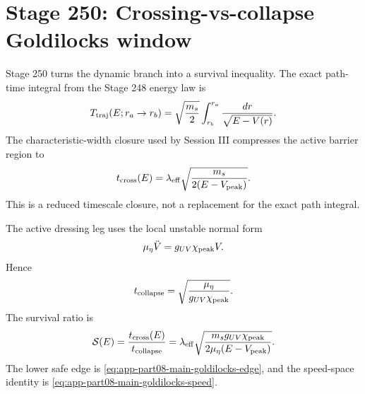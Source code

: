 \section{Stage 250: Crossing-vs-collapse Goldilocks window}
\label{sec:app-part08:crossing-vs-collapse-goldilocks-window}
\label{stage:250}


Stage 250 turns the dynamic branch into a survival inequality.  The exact path-time integral from the Stage 248 energy law is
\begin{equation}
\label{eq:app-part08-stage250-path-time}
T_{\rm traj}(E;r_a\to r_b)
=
\sqrt{\frac{m_s}{2}}
\int_{r_b}^{r_a}\frac{dr}{\sqrt{E-V(r)}}.
\end{equation}
The characteristic-width closure used by Session III compresses the active barrier region to
\begin{equation}
\label{eq:app-part08-stage250-cross-time}
t_{\rm cross}(E)
=
\lambda_{\rm eff}\sqrt{\frac{m_s}{2(E-V_{\rm peak})}}.
\end{equation}
This is a reduced timescale closure, not a replacement for the exact path integral.

The active dressing leg uses the local unstable normal form
\begin{equation}
\label{eq:app-part08-stage250-v-leg}
\mu_\eta\ddot V=g_{UV}\chi_{\rm peak}V.
\end{equation}
Hence
\begin{equation}
\label{eq:app-part08-stage250-collapse-time}
t_{\rm collapse}=
\sqrt{\frac{\mu_\eta}{g_{UV}\chi_{\rm peak}}}.
\end{equation}
The survival ratio is
\begin{equation}
\label{eq:app-part08-stage250-survival-ratio}
\mathcal S(E)=\frac{t_{\rm cross}(E)}{t_{\rm collapse}}
=
\lambda_{\rm eff}
\sqrt{\frac{m_sg_{UV}\chi_{\rm peak}}{2\mu_\eta(E-V_{\rm peak})}}.
\end{equation}
The lower safe edge is \cref{eq:app-part08-main-goldilocks-edge}, and the speed-space identity is \cref{eq:app-part08-main-goldilocks-speed}.

